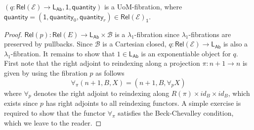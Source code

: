 \documentclass[a4paper,UKenglish]{lipics}
\newcommand{\LamOneFib}{$\lambda_1$-fibration\xspace}
\newcommand{\LamOneFibs}{$\lambda_1$-fibrations\xspace}
\newcommand{\msf}[1]{\mathsf{#1}} %
\newcommand{\LAb}{\msf{L}_{\msf{Ab}}}
\newcommand{\terminal}{\msf{1}}
\newcommand{\Rel}{\msf{Rel}}
\newcommand{\B}{\mathcal{B}}
\newcommand{\C}{\mathcal{C}}
\newcommand{\E}{\mathcal{E}}
\newcommand{\fibreE}[1]{\E_{_{#1}}}
\newcommand{\bracket}[1]{\left( #1 \right)}
\newcommand{\bbracket}[1]{\bigl( #1 \bigr)}
\newcommand{\num}{\msf{quantity}}
\newcommand{\UoMFibration}{UoM-fibration\xspace}
\begin{document}
\begin{theorem}
\label{thm:logUoM}
$(q:\Rel(\E) \rightarrow \LAb, \terminal, \num)$ is a \UoMFibration, where $\num = (\terminal, \num_0, \num_r) \in \Rel(\E)_\terminal$.
\end{theorem}
\begin{proof}
$\Rel(p):\Rel(E) \rightarrow \LAb \times \B$ is a \LamOneFib since \LamOneFibs are preserved by pullbacks. Since $\B$ is a Cartesian closed, $q:\Rel(\E) \rightarrow \LAb$ is also a \LamOneFib.
%
It remains to show that $1\in \LAb$ is an exponentiable object for $q$. First note that
the right adjoint to reindexing along a projection $\pi : n+1 \rightarrow n$ is given by using the fibration $p$ as follows
\[
\forall_\pi (n+1, B, X) = (n+1,B, \forall_{p} X)
\]
where $\forall_p$ denotes the right adjoint to reindexing along $R(\pi ) \times id_B \times id_B$,
which exists since $p$ has right adjoints to all reindexing functors. A simple exercise is required to show that the functor $\forall_\pi$ satisfies the Beck-Chevalley condition, which we leave to the reader.


%
%
 \end{proof}
\end{document}
